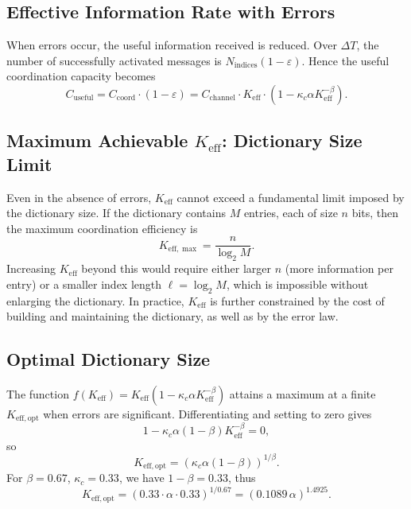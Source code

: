 \documentclass[12pt,a4paper]{article}
\theoremstyle{remark}
\newcommand{\Keff}{K_{\mathrm{eff}}}
\newcommand{\Keffopt}{K_{\mathrm{eff},\mathrm{opt}}}
\newcommand{\Keffmax}{K_{\mathrm{eff},\max}}
\begin{document}
	\subsection{Effective Information Rate with Errors}
	
	When errors occur, the useful information received is reduced. Over $\Delta T$, the number of successfully activated messages is $N_{\text{indices}}(1 - \varepsilon)$. Hence the useful coordination capacity becomes
	\begin{equation}
		C_{\text{useful}} = C_{\text{coord}} \cdot (1 - \varepsilon) = C_{\text{channel}} \cdot \Keff \cdot (1 - \kappa_c \alpha \Keff^{-\beta}).
		\label{eq:useful-rate}
	\end{equation}
	
	\subsection{Maximum Achievable $\Keff$: Dictionary Size Limit}
	
	Even in the absence of errors, $\Keff$ cannot exceed a fundamental limit imposed by the dictionary size. If the dictionary contains $M$ entries, each of size $n$ bits, then the maximum coordination efficiency is
	\begin{equation}
		\Keffmax = \frac{n}{\log_2 M}. \label{eq:keff-max}
	\end{equation}
	Increasing $\Keff$ beyond this would require either larger $n$ (more information per entry) or a smaller index length $\ell = \log_2 M$, which is impossible without enlarging the dictionary. In practice, $\Keff$ is further constrained by the cost of building and maintaining the dictionary, as well as by the error law.
	
	\subsection{Optimal Dictionary Size}
	
	The function $f(\Keff) = \Keff \left(1 - \kappa_c \alpha \Keff^{-\beta}\right)$ attains a maximum at a finite $\Keffopt$ when errors are significant. Differentiating and setting to zero gives
	\begin{equation}
		1 - \kappa_c \alpha (1 - \beta) \Keff^{-\beta} = 0,
	\end{equation}
	so
	\begin{equation}
		\Keffopt = \left( \kappa_c \alpha (1 - \beta) \right)^{1/\beta}.
		\label{eq:keff-opt}
	\end{equation}
	For $\beta = 0.67$, $\kappa_c = 0.33$, we have $1-\beta = 0.33$, thus
	\[
	\Keffopt = \left(0.33 \cdot \alpha \cdot 0.33\right)^{1/0.67} = (0.1089 \,\alpha)^{1.4925}.
	\]
	
\end{document}
